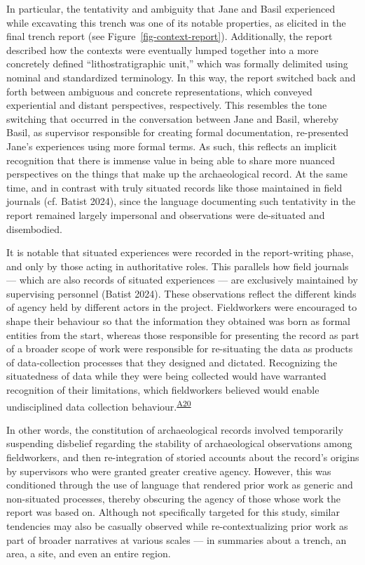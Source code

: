 \documentclass[
]{article}
\begin{document}
In particular, the tentativity and ambiguity that Jane and Basil
experienced while excavating this trench was one of its notable
properties, as elicited in the final trench report (see
Figure~\ref{fig-context-report}). Additionally, the report described how
the contexts were eventually lumped together into a more concretely
defined ``lithostratigraphic unit,'' which was formally delimited using
nominal and standardized terminology. In this way, the report switched
back and forth between ambiguous and concrete representations, which
conveyed experiential and distant perspectives, respectively. This
resembles the tone switching that occurred in the conversation between
Jane and Basil, whereby Basil, as supervisor responsible for creating
formal documentation, re-presented Jane's experiences using more formal
terms. As such, this reflects an implicit recognition that there is
immense value in being able to share more nuanced perspectives on the
things that make up the archaeological record. At the same time, and in
contrast with truly situated records like those maintained in field
journals (cf. Batist 2024), since the language documenting such
tentativity in the report remained largely impersonal and observations
were de-situated and disembodied.

It is notable that situated experiences were recorded in the
report-writing phase, and only by those acting in authoritative roles.
This parallels how field journals --- which are also records of situated
experiences --- are exclusively maintained by supervising personnel
(Batist 2024). These observations reflect the different kinds of agency
held by different actors in the project. Fieldworkers were encouraged to
shape their behaviour so that the information they obtained was born as
formal entities from the start, whereas those responsible for presenting
the record as part of a broader scope of work were responsible for
re-situating the data as products of data-collection processes that they
designed and dictated. Recognizing the situatedness of data while they
were being collected would have warranted recognition of their
limitations, which fieldworkers believed would enable undisciplined data
collection behaviour.\textsuperscript{\hyperref[sec-A20]{A20}}

In other words, the constitution of archaeological records involved
temporarily suspending disbelief regarding the stability of
archaeological observations among fieldworkers, and then re-integration
of storied accounts about the record's origins by supervisors who were
granted greater creative agency. However, this was conditioned through
the use of language that rendered prior work as generic and non-situated
processes, thereby obscuring the agency of those whose work the report
was based on. Although not specifically targeted for this study, similar
tendencies may also be casually observed while re-contextualizing prior
work as part of broader narratives at various scales --- in summaries
about a trench, an area, a site, and even an entire region.
\end{document}
